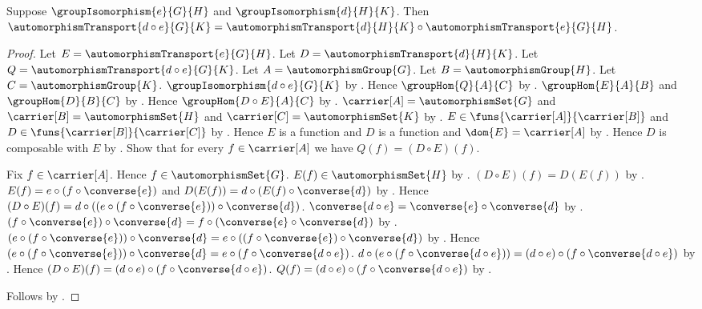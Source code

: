 \begin{theorem}\label{automorphism_transport_composition}
    Suppose $\groupIsomorphism{e}{G}{H}$ and
        $\groupIsomorphism{d}{H}{K}$.
    Then
        $\automorphismTransport{d\circ e}{G}{K}=
            \automorphismTransport{d}{H}{K}\circ
                \automorphismTransport{e}{G}{H}$.
\end{theorem}
\begin{proof}
    Let $E=\automorphismTransport{e}{G}{H}$.
    Let $D=\automorphismTransport{d}{H}{K}$.
    Let $Q=\automorphismTransport{d\circ e}{G}{K}$.
    Let $A=\automorphismGroup{G}$.
    Let $B=\automorphismGroup{H}$.
    Let $C=\automorphismGroup{K}$.
    $\groupIsomorphism{d\circ e}{G}{K}$ by
        .
    Hence $\groupHom{Q}{A}{C}$ by
        .
    $\groupHom{E}{A}{B}$ and $\groupHom{D}{B}{C}$ by
        .
    Hence $\groupHom{D\circ E}{A}{C}$ by
        .
    $\carrier[A]=\automorphismSet{G}$ and
        $\carrier[B]=\automorphismSet{H}$ and
        $\carrier[C]=\automorphismSet{K}$ by
        .
    $E\in\funs{\carrier[A]}{\carrier[B]}$ and
        $D\in\funs{\carrier[B]}{\carrier[C]}$ by
        .
    Hence $E$ is a function and $D$ is a function and
        $\dom{E}=\carrier[A]$ by
        .
    Hence $D$ is composable with $E$ by
        .
    Show that for every $f\in\carrier[A]$ we have
        $Q(f)=(D\circ E)(f)$.
    \begin{subproof}
        Fix $f\in\carrier[A]$.
        Hence $f\in\automorphismSet{G}$.
        $E(f)\in\automorphismSet{H}$ by
            .
        $(D\circ E)(f)=D(E(f))$ by .
        $E(f)=e\circ(f\circ\converse{e})$ and
            $D(E(f))=d\circ(E(f)\circ\converse{d})$ by
            .
        Hence
            $(D\circ E)(f)=
                d\circ((e\circ(f\circ\converse{e}))
                    \circ\converse{d})$.
        $\converse{d\circ e}=\converse{e}\circ\converse{d}$ by
            .
        $(f\circ\converse{e})\circ\converse{d}=
            f\circ(\converse{e}\circ\converse{d})$ by
            .
        $(e\circ(f\circ\converse{e}))\circ\converse{d}=
            e\circ((f\circ\converse{e})\circ\converse{d})$ by
            .
        Hence
            $(e\circ(f\circ\converse{e}))\circ\converse{d}=
                e\circ(f\circ\converse{d\circ e})$.
        $d\circ(e\circ(f\circ\converse{d\circ e}))=
            (d\circ e)\circ(f\circ\converse{d\circ e})$ by
            .
        Hence
            $(D\circ E)(f)=
                (d\circ e)\circ(f\circ\converse{d\circ e})$.
        $Q(f)=(d\circ e)\circ(f\circ\converse{d\circ e})$ by
            .
    \end{subproof}
    Follows by .
\end{proof}

